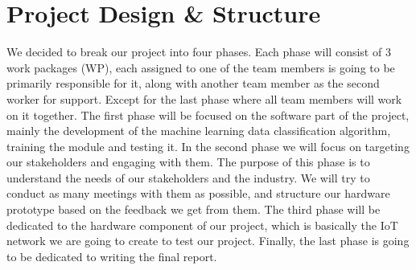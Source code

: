 \documentclass{article}
\begin{document}
\section{Project Design \& Structure}
We decided to break our project into four phases. Each phase will consist of 3 work packages (WP), each assigned to one of the team members is going to be primarily responsible for it, along with another team member as the second worker for support. Except for the last phase where all team members will work on it together. The first phase will be focused on the software part of the project, mainly the development of the machine learning data classification algorithm, training the module and testing it. In the second phase we will focus on targeting our stakeholders and engaging with them. The purpose of this phase is to understand the needs of our stakeholders and the industry. We will try to conduct as many meetings with them as possible, and structure our hardware prototype based on the feedback we get from them. The third phase will be dedicated to the hardware component of our project, which is basically the IoT network we are going to create to test our project. Finally, the last phase is going to be dedicated to writing the final report.\newline
\end{document}
